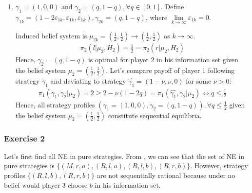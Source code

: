 \documentclass[]{article}
\begin{document}
\begin{enumerate}
	\item $\gamma_1 = (1, 0, 0)$ and $\gamma_2 = (q, 1 - q), \forall q\in[0, 1]$. Define $\gamma_{1k} = (1 - 2\varepsilon_{1k}, \varepsilon_{1k}, \varepsilon_{1k}), \gamma_{2k} = (q, 1 - q)$, where $\lim\limits_{k\to\infty}\varepsilon_{1k} = 0$.
	
	Induced belief system is $\mu_{2k} = (\frac{1}{2}, \frac{1}{2}) \to (\frac{1}{2}, \frac{1}{2})$ as $k\to\infty$.
	\begin{equation}
		\begin{split}
			\pi_2(l|\mu_2, H_2) = \frac{1}{2} = \pi_2(r|\mu_2, H_2) \nonumber
		\end{split}
	\end{equation}
	Hence, $\gamma_2 = (q, 1 - q)$ is optimal for player 2 in his information set given the belief system $\mu_2 = (\frac{1}{2}, \frac{1}{2})$. Let's compare payoff of player 1 following strategy $\gamma_1$ and deviating to strategy $\hat{\gamma_1} = (1 - \nu, \nu, 0)$ for some $\nu > 0$:
	\begin{equation}
		\begin{split}
			\pi_1(\gamma_1, \gamma_2|\mu_2) = 2 \geq 2 - \nu(1 - 2q) = \pi_1(\hat{\gamma_1}, \gamma_2|\mu_2) \iff q \leq\frac{1}{2} \nonumber
		\end{split}
	\end{equation}
	Hence, all strategy profiles $(\gamma_1 = (1, 0, 0), \gamma_2 = (q, 1 - q)), \forall q\leq\frac{1}{2}$ given the belief system $\mu_2 = (\frac{1}{2}, \frac{1}{2})$ constitute sequential equilibria.
\end{enumerate}

\subsubsection*{Exercise 2}

Let's first find all NE in pure strategies. From , we can see that the set of NE in pure strategies is $\{(M, r, a), (R, l, a), (R, l, b), (R, r, b)\}$. However, strategy profiles $\{(R, l, b), (R, r, b)\}$ are not sequentially rational because under no belief would player 3 choose $b$ in his information set. 
\end{document}
